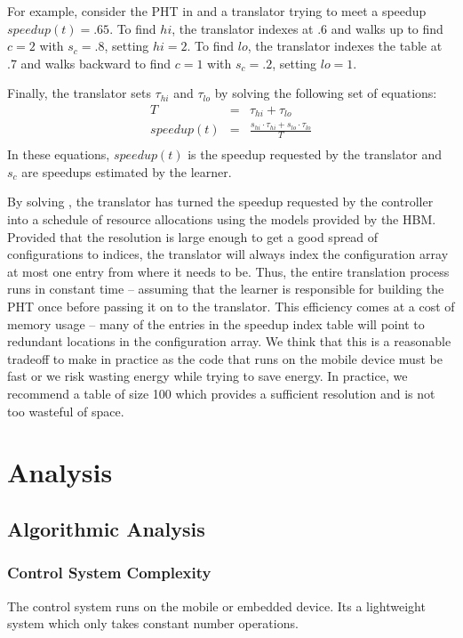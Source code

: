 For example, consider the PHT in  and a translator trying
to meet a speedup $speedup(t) = .65$.  To find $hi$, the translator indexes
at .6 and walks up to find $c=2$ with $s_c=.8$, setting $hi = 2$.  To
find $lo$, the translator indexes the table at .7 and walks backward
to find $c=1$ with $s_c=.2$, setting $lo = 1$.

Finally, the translator sets $\tau_{hi}$ and $\tau_{lo}$ by solving the
following set of equations:
\begin{eqnarray}
  T &=& \tau_{hi} + \tau_{lo}    \label{eqn:s1} \\
  speedup(t) &=& \frac{s_{hi} \cdot \tau_{hi} + s_{lo} \cdot \tau_{lo}}{T} \label{eqn:s2} \\
  \label{eq:pht}
\end{eqnarray}
In these equations, $speedup(t)$ is the speedup requested by the translator
and $s_c$ are speedups estimated by the learner.

By solving , the translator has turned the speedup
requested by the controller into a schedule of resource allocations
using the models provided by the HBM.  Provided that the resolution is
large enough to get a good spread of configurations to indices, the
translator will always index the configuration array at most one entry
from where it needs to be.  Thus, the entire translation process runs
in constant time -- assuming that the learner is responsible for
building the PHT once before passing it on to the translator.  This
efficiency comes at a cost of memory usage -- many of the entries in
the speedup index table will point to redundant locations in the
configuration array.  We think that this is a reasonable tradeoff to
make in practice as the code that runs on the mobile device must be
fast or we risk wasting energy while trying to save energy.  In
practice, we recommend a table of size 100 which provides a sufficient
resolution and is not too wasteful of space.

\section{Analysis}
\subsection{Algorithmic Analysis}

\subsubsection{Control System Complexity}
The control system runs on the mobile or embedded device. Its a lightweight system which only takes constant number operations.

